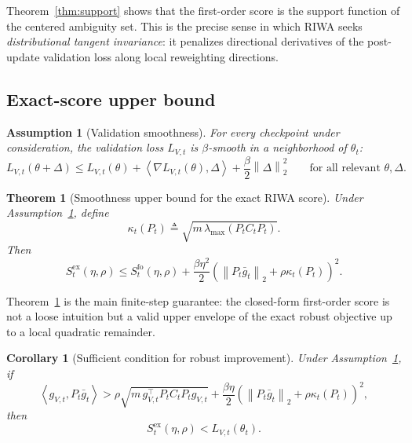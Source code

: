 \documentclass{article}
\newtheorem{theorem}{Theorem}
\newtheorem{corollary}{Corollary}
\newtheorem{assumption}{Assumption}
\newcommand{\riwa}{\textup{\textsc{RIWA}}}
\newcommand{\norm}[1]{\left\lVert #1 \right\rVert}
\newcommand{\inner}[2]{\left\langle #1, #2 \right\rangle}
\begin{document}
Theorem~\ref{thm:support} shows that the first-order score is the support function of the centered ambiguity set. This is the precise sense in which \riwa{} seeks \emph{distributional tangent invariance}: it penalizes directional derivatives of the post-update validation loss along local reweighting directions.

\subsection{Exact-score upper bound}

\begin{assumption}[Validation smoothness]
\label{ass:smooth}
For every checkpoint under consideration, the validation loss $L_{V,t}$ is $\beta$-smooth in a neighborhood of $\theta_t$:
\begin{equation}
    L_{V,t}(\theta + \Delta)
    \le
    L_{V,t}(\theta)
    +
    \inner{\nabla L_{V,t}(\theta)}{\Delta}
    +
    \frac{\beta}{2}\norm{\Delta}_2^2
    \qquad
    \text{for all relevant } \theta,\Delta.
\end{equation}
\end{assumption}

\begin{theorem}[Smoothness upper bound for the exact \riwa{} score]
\label{thm:smooth}
Under Assumption~\ref{ass:smooth}, define
\begin{equation}
    \kappa_t(P_t)
    \triangleq
    \sqrt{m\, \lambda_{\max}(P_t C_t P_t)}.
\end{equation}
Then
\begin{equation}
    S_t^{\mathrm{ex}}(\eta,\rho)
    \le
    S_t^{\mathrm{fo}}(\eta,\rho)
    +
    \frac{\beta \eta^2}{2}
    \left(
        \norm{P_t \bar g_t}_2 + \rho \kappa_t(P_t)
    \right)^2.
    \label{eq:smooth_upper}
\end{equation}
\end{theorem}

Theorem~\ref{thm:smooth} is the main finite-step guarantee: the closed-form first-order score is not a loose intuition but a valid upper envelope of the exact robust objective up to a local quadratic remainder.

\begin{corollary}[Sufficient condition for robust improvement]
\label{cor:improve}
Under Assumption~\ref{ass:smooth}, if
\begin{equation}
    \inner{g_{V,t}}{P_t \bar g_t}
    >
    \rho \sqrt{m\, g_{V,t}^\top P_t C_t P_t g_{V,t}}
    +
    \frac{\beta \eta}{2}
    \left(
        \norm{P_t \bar g_t}_2 + \rho \kappa_t(P_t)
    \right)^2,
\end{equation}
then
\begin{equation}
    S_t^{\mathrm{ex}}(\eta,\rho)
    <
    L_{V,t}(\theta_t).
\end{equation}
\end{corollary}
\end{document}
